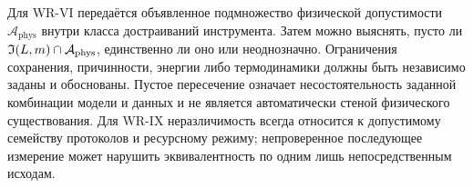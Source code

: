 {Для WR-VI передаётся объявленное подмножество физической допустимости $\mathcal A_{\mathrm{phys}}$ внутри класса достраиваний инструмента. Затем можно выяснять, пусто ли $\mathfrak I(L,m)\cap\mathcal A_{\mathrm{phys}}$, единственно ли оно или неоднозначно. Ограничения сохранения, причинности, энергии либо термодинамики должны быть независимо заданы и обоснованы. Пустое пересечение означает несостоятельность заданной комбинации модели и данных и не является автоматически стеной физического существования. Для WR-IX неразличимость всегда относится к допустимому семейству протоколов и ресурсному режиму; непроверенное последующее измерение может нарушить эквивалентность по одним лишь непосредственным исходам.}

